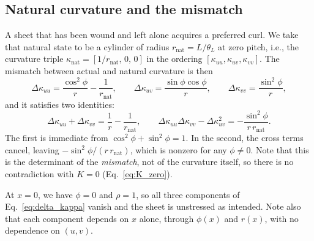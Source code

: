 \documentclass[11pt]{article}
\begin{document}
\subsection{Natural curvature and the mismatch}\label{sec:natural}
A sheet that has been wound and left alone acquires a preferred curl. We take
that natural state to be a cylinder of radius $r_{\mathrm{nat}} = L/\theta_L$ at
zero pitch, i.e., the curvature triple
$\kappa_{\mathrm{nat}} = \left[1/r_{\mathrm{nat}},\, 0,\, 0\right]$ in the
ordering $\left[\kappa_{uu}, \kappa_{uv}, \kappa_{vv}\right]$. 
The mismatch between actual and natural curvature is then
\begin{equation}\label{eq:delta_kappa}
    \boxed{\;\Delta\kappa_{uu} = \frac{\cos^{2}\phi}{r}
      - \frac{1}{r_{\mathrm{nat}}}, \qquad
    \Delta\kappa_{uv} = \frac{\sin\phi\cos\phi}{r}, \qquad
    \Delta\kappa_{vv} = \frac{\sin^{2}\phi}{r},\;}
\end{equation}
and it satisfies two identities:
\begin{equation}\label{eq:trace_identity}
    \Delta\kappa_{uu} + \Delta\kappa_{vv}
      = \frac{1}{r} - \frac{1}{r_{\mathrm{nat}}},
    \qquad
    \Delta\kappa_{uu}\Delta\kappa_{vv} - \Delta\kappa_{uv}^{2}
      = -\frac{\sin^{2}\phi}{r\,r_{\mathrm{nat}}}.
\end{equation}
The first is immediate from $\cos^{2}\phi + \sin^{2}\phi = 1$. In the second, the cross terms cancel, leaving $-\sin^{2}\phi/\left(r\,r_{\mathrm{nat}}\right)$,
which is nonzero for any $\phi \neq 0$. Note that this is the determinant
of the \emph{mismatch}, not of the curvature itself, so there is no contradiction
with $K = 0$ (Eq.~\ref{eq:K_zero}).

At $x = 0$, we have $\phi = 0$ and $\rho = 1$, so all three components of
Eq.~\eqref{eq:delta_kappa} vanish and the sheet is unstressed as intended. Note
also that each component depends on $x$ alone, through $\phi(x)$ and $r(x)$, with no dependence on $(u,v)$.
\end{document}
